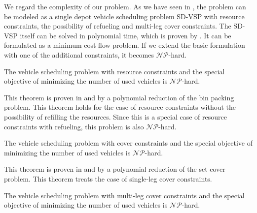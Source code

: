 We regard the complexity of our problem. As we have seen in , the problem can be modeled as a single depot vehicle scheduling problem SD-VSP with resource constraints, the possibility of refueling and multi-leg cover constraints. The SD-VSP itself can be solved in polynomial time, which is proven by \cite{Dantzig_Fulkerson}. It can be formulated as a minimum-cost flow problem. If we extend the basic formulation with one of the additional constraints, it becomes $\mathcal{NP}$-hard.

\begin{theorem}
\label{th:complexity_VSPRC}

The vehicle scheduling problem with resource constraints and the special objective of minimizing the number of used vehicles is $\mathcal{NP}$-hard.

\end{theorem}

This theorem is proven in \cite[p.~11]{Kaiser} and\cite[p.~11]{Knoll} by a polynomial reduction of the bin packing problem. This theorem holds for the case of resource constraints without the possibility of refilling the resources. Since this is a special case of resource constraints with refueling, this problem is also $\mathcal{NP}$-hard. 

\begin{theorem}
\label{th:complexity_VSPSC}

The vehicle scheduling problem with cover constraints and the special objective of minimizing the number of used vehicles is $\mathcal{NP}$-hard.

\end{theorem}

This theorem is proven in \cite[p.~12]{Kaiser} and \cite[p.~12]{Knoll} by a polynomial reduction of the set cover problem. This theorem treats the case of single-leg cover constraints.

\begin{theorem}
\label{th:complexity_VSPMC}

The vehicle scheduling problem with multi-leg cover constraints and the special objective of minimizing the number of used vehicles is $\mathcal{NP}$-hard.

\end{theorem}

